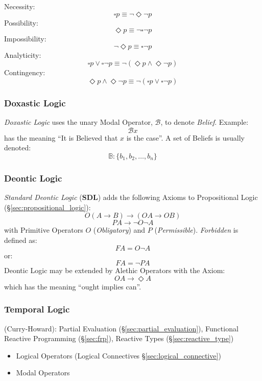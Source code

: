 Necessity:
\[
  \square p \equiv \neg \Diamond \neg p
\]
Possibility:
\[
  \Diamond p \equiv \neg \square \neg p
\]
Impossibility:
\[
  \neg \Diamond p \equiv \square \neg p
\]
Analyticity:
\[
  \square p \vee \square \neg p
  \equiv \neg (\Diamond p \wedge \Diamond \neg p)
\]
Contingency:
\[
  \Diamond p \wedge \Diamond \neg p
  \equiv \neg (\square p \vee \square \neg p)
\]



\subsubsection{Doxastic Logic}\label{sec:doxastic_logic}

\emph{Doxastic Logic} uses the unary Modal Operator, $\mathcal{B}$, to
denote \emph{Belief}. Example:
\[
  \mathcal{B} x
\]
has the meaning ``It is Believed that $x$ is the case''. A set of
Beliefs is usually denoted:
\[
  \mathbb{B}: \{ b_1, b_2, \ldots, b_n \}
\]



\subsubsection{Deontic Logic}\label{sec:deontic_logic}

\emph{Standard Deontic Logic} ($\mathbf{SDL}$) adds the following
Axioms to Propositional Logic (\S\ref{sec:propositional_logic}):
\[
  O(A \rightarrow B) \rightarrow (OA \rightarrow OB)
\]
\[
  PA \rightarrow \neg O \neg A
\]
with Primitive Operators $O$ (\emph{Obligatory}) and $P$
(\emph{Permissible}). \emph{Forbidden} is defined as:
\[
  FA = O \neg A
\]
or:
\[
  FA = \neg P A
\]
Deontic Logic may be extended by Alethic Operators with the Axiom:
\[
  OA \rightarrow \Diamond A
\]
which has the meaning ``ought implies can''.



\subsubsection{Temporal Logic}\label{sec:temporal_logic}

(Curry-Howard): Partial Evaluation (\S\ref{sec:partial_evaluation}),
Functional Reactive Programming (\S\ref{sec:frp}), Reactive Types
(\S\ref{sec:reactive_type})

\begin{itemize}
  \item Logical Operators (Logical Connectives
    \S\ref{sec:logical_connective})
  \item Modal Operators
\end{itemize}



